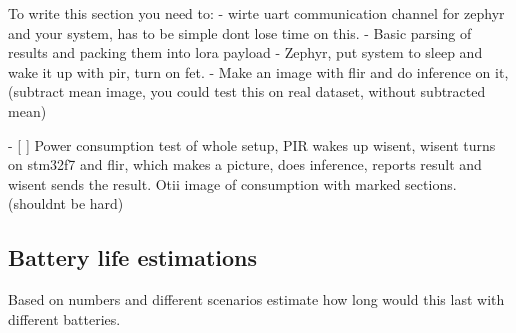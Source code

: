 To write this section you need to:
 - wirte uart communication channel for zephyr and your system, has to be simple dont lose time on this.
 - Basic parsing of results and packing them into lora payload
 - Zephyr, put system to sleep and wake it up with pir, turn on fet.
 - Make an image with flir and do inference on it, (subtract mean image, you could test this on real dataset, without subtracted mean)

- [ ] Power consumption test of whole setup, 
      PIR wakes up wisent, 
      wisent turns on stm32f7 and flir, 
      which makes a picture, does inference, reports result and wisent sends the result. 
      Otii image of consumption with marked sections.(shouldnt be hard)

\subsection{ Battery life estimations}
Based on numbers and different scenarios estimate how long would this last with different batteries.
